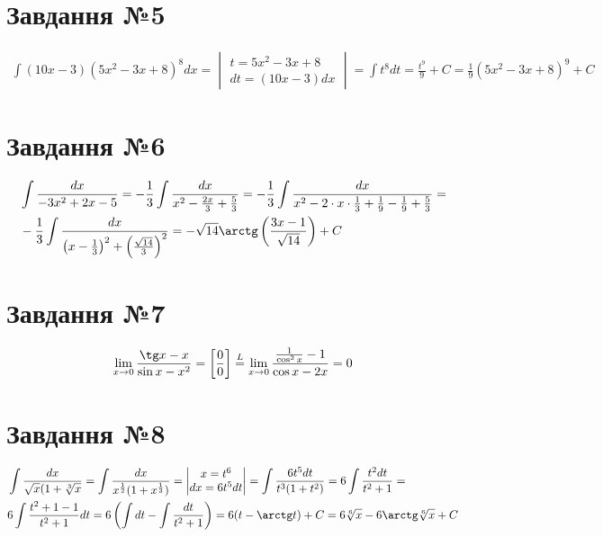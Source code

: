 \documentclass{report}
\begin{document}
\section{Завдання №5}
\begin{equation}\label{eq5}\begin{split}
	 \int (10x - 3)(5x^2 - 3x + 8)^8 dx = \begin{vmatrix}t = 5x^2 - 3x + 8\\dt = (10x - 3)dx\end{vmatrix} = \int t^8 dt = \frac{t^9}{9} + C = \frac{1}{9}(5x^2 - 3x + 8)^9 + C
\end{split}\end{equation}

\section{Завдання №6}
\begin{equation}\label{eq6}\begin{split}
	& \int \frac{dx}{-3x^2 + 2x - 5} = -\frac{1}{3}\int\frac{dx}{x^2 -\frac{2x}{3} + \frac{5}{3}} = -\frac{1}{3}\int\frac{dx}{x^2 - 2 \cdot x \cdot \frac{1}{3} + \frac{1}{9} - \frac{1}{9} + \frac{5}{3}} =\\
	& -\frac{1}{3}\int\frac{dx}{\left(x - \frac{1}{3}\right)^2 + \left(\frac{\sqrt{14}}{3}\right)^2} = -\sqrt{14}\arctg\left(\frac{3x-1}{\sqrt{14}}\right) + C
\end{split}
\end{equation}

\section{Завдання №7}
\begin{equation}\label{eq7}
	\lim_{x \to 0} \frac{\tg x - x}{\sin x - x^{2}} = \left[\frac{0}{0}\right] \overset{L}{=} \lim_{x \to 0} \frac{\frac{1}{\cos^{2}x} - 1}{\cos x - 2x} = 0
\end{equation}

\section{Завдання №8}
\begin{equation}\label{eq8}\begin{split}
	& \int \frac{dx}{\sqrt{x}(1 + \sqrt[3]{x}} = \int \frac{dx}{x^{\frac{1}{2}}(1 + x^{\frac{1}{3}})} = \begin{vmatrix}x = t^{6}\\dx = 6t^5dt\end{vmatrix} = \int \frac{6t^5 dt}{t^3(1 + t^2)} = 6\int \frac{t^2 dt}{t^2 + 1} =\\
	& 6\int \frac{t^2 + 1 - 1}{t^2 + 1}dt = 6\left(\int dt - \int\frac{dt}{t^2 + 1}\right) = 6(t - \arctg t) + C = 6\sqrt[6]{x} - 6\arctg \sqrt[6]{x} + C
\end{split}
\end{equation}
\end{document}
